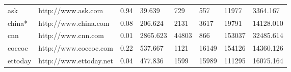 \begin{table}[]
{\begin{tabular}{|l|l|l|l|l|l|l|l|}
\rowcolor[HTML]{EFEFEF} 
ask               & http://www.ask.com         & 0.94                                                                                & 39.639                                                                            & 729                                                            & 557                                                           & 11977                                                                & 3364.167                                                                       \\
china*            & http://www.china.com       & 0.08                                                                                & 206.624                                                                           & 2131                                                           & 3617                                                          & 19791                                                                & 14128.010                                                                      \\
\rowcolor[HTML]{EFEFEF} 
cnn               & http://www.cnn.com         & 0.01                                                                                & 2865.623                                                                          & 44803                                                          & 866                                                           & 153037                                                               & 32485.614                                                                      \\
coccoc            & http://www.coccoc.com      & 0.22                                                                                & 537.667                                                                           & 1121                                                           & 16149                                                         & 154126                                                               & 14360.126                                                                      \\
\rowcolor[HTML]{EFEFEF} 
ettoday           & http://www.ettoday.net     & 0.04                                                                                & 477.836                                                                           & 1599                                                           & 15989                                                         & 111295                                                               & 16075.164                                                                      \\

\end{tabular}}
\end{table}
